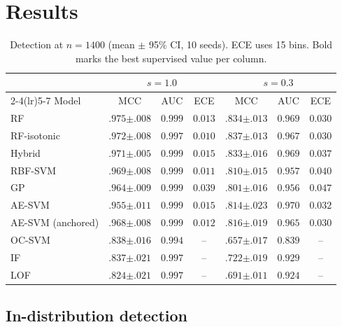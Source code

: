 \documentclass[conference,10pt]{IEEEtran}
\begin{document}
\section{Results}

\begin{table}[t]
  \centering
  \caption{Detection at $n=1400$ (mean $\pm$ 95\% CI, 10 seeds). ECE uses 15 bins. Bold marks the best supervised value per column.}
  \label{tab:bench}
  \footnotesize
  \begin{tabular}{lcccccc}
    \toprule
    & \multicolumn{3}{c}{$s=1.0$} & \multicolumn{3}{c}{$s=0.3$} \\
    \cmidrule(lr){2-4}\cmidrule(lr){5-7}
    Model & MCC & AUC & ECE & MCC & AUC & ECE \\
    \midrule
    RF & $\mathbf{.975{\scriptstyle\pm.008}}$ & $\mathbf{0.999}$ & $0.013$ & $.834{\scriptstyle\pm.013}$ & $0.969$ & $\mathbf{0.030}$ \\
    RF-isotonic & $.972{\scriptstyle\pm.008}$ & $0.997$ & $\mathbf{0.010}$ & $\mathbf{.837{\scriptstyle\pm.013}}$ & $0.967$ & $\mathbf{0.030}$ \\
    Hybrid & $.971{\scriptstyle\pm.005}$ & $\mathbf{0.999}$ & $0.015$ & $.833{\scriptstyle\pm.016}$ & $0.969$ & $0.037$ \\
    RBF-SVM & $.969{\scriptstyle\pm.008}$ & $\mathbf{0.999}$ & $0.011$ & $.810{\scriptstyle\pm.015}$ & $0.957$ & $0.040$ \\
    GP & $.964{\scriptstyle\pm.009}$ & $\mathbf{0.999}$ & $0.039$ & $.801{\scriptstyle\pm.016}$ & $0.956$ & $0.047$ \\
    AE-SVM & $.955{\scriptstyle\pm.011}$ & $\mathbf{0.999}$ & $0.015$ & $.814{\scriptstyle\pm.023}$ & $\mathbf{0.970}$ & $0.032$ \\
    AE-SVM (anchored) & $.968{\scriptstyle\pm.008}$ & $\mathbf{0.999}$ & $0.012$ & $.816{\scriptstyle\pm.019}$ & $0.965$ & $\mathbf{0.030}$ \\
    \midrule
    OC-SVM & $.838{\scriptstyle\pm.016}$ & $0.994$ & -- & $.657{\scriptstyle\pm.017}$ & $0.839$ & -- \\
    IF & $.837{\scriptstyle\pm.021}$ & $0.997$ & -- & $.722{\scriptstyle\pm.019}$ & $0.929$ & -- \\
    LOF & $.824{\scriptstyle\pm.021}$ & $0.997$ & -- & $.691{\scriptstyle\pm.011}$ & $0.924$ & -- \\
    \bottomrule
  \end{tabular}
\end{table}

\subsection{In-distribution detection}
\end{document}
